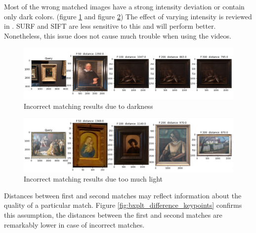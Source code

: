 Most of the wrong matched images have a strong intensity deviation or contain only dark colors. (figure \ref{fig:wrong_result_dark} and figure \ref{fig:wrong_result_light}) The effect of varying intensity is reviewed in \cite{orb_surf_sift_evaluation}. SURF and SIFT are less sensitive to this and will perform better. Nonetheless, this issue does not cause much trouble when using the videos.

\begin{figure}[htbp]
    \includegraphics[width=1.0\columnwidth]{images/wrong_result cropped.png}
    \centering
    \caption{Incorrect matching results due to darkness}
    \label{fig:wrong_result_dark}
\end{figure}

\begin{figure}[htbp]
    \includegraphics[width=1.0\columnwidth]{images/wrong_results_int.png}
    \centering
    \caption{Incorrect matching results due too much light}
    \label{fig:wrong_result_light}
\end{figure}


Distances between first and second matches may reflect information about the quality of a particular match. Figure \ref{fig:bxplt_difference_keypoints} confirms this assumption, the distances between the first and second matches are remarkably lower in case of incorrect matches.


